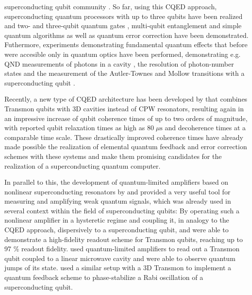 superconducting qubit community . So far, using this CQED approach, superconducting quantum processors with up to three qubits have been realized and two- and three-qubit quantum gates \citep{fedorov_implementation_2011}, multi-qubit entanglement \citep{dicarlo_preparation_2010} and simple quantum algorithms \citep{dicarlo_demonstration_2009} as well as quantum error correction \citep{reed_realization_2011} have been demonstrated. Futhermore, experiments demonstrating fundamental quantum effects that before were accesible only in quantum optics have been performed, demonstrating e.g. QND measurements of photons in a cavity \citep{johnson_quantum_2010}, the resolution of photon-number states \citep{schuster_resolving_2007} and the measurement of the Autler-Townes and Mollow transitions with a superconducting qubit \citep{baur_measurement_2009}.

Recently, a new type of CQED architecture has been developed by \cite{paik_observation_2011} that combines Transmon qubits with 3D cavities instead of CPW resonators, resulting again in an impressive increase of qubit coherence times of up to two orders of magnitude, with reported qubit relaxation times as high as $80 \; \mu \mathrm{s}$ and decoherence times at a comparable time scale. These drastically improved coherence times have already made possible the realization of elemental quantum feedback and error correction schemes with these systems  and make them promising candidates for the realization of a superconducting quantum computer.

In parallel to this, the development of quantum-limited amplifiers based on nonlinear superconducting resonators by \cite{siddiqi_rf-driven_2004} and \cite{vijay_invited_2009} provided a very useful tool for measuring and amplifying weak quantum signals, which was already used in several context within the field of superconducting qubits: By operating such a nonlinear amplifier in a hysteretic regime and coupling it, in analogy to the CQED approach, dispersively to a superconducting qubit, \cite{siddiqi_dispersive_2006} and \cite{mallet_single-shot_2009} were able to demonstrate a high-fidelity readout scheme for Transmon qubits, reaching up to 97 \% readout fidelity. \cite{vijay_observation_2011} used quantum-limited amplifiers to read out a Transmon qubit coupled to a linear microwave cavity and were able to observe quantum jumps of its state.  used a similar setup with a 3D Transmon to implement a quantum feedback scheme to phase-stabilize a Rabi oscillation of a superconducting qubit.

